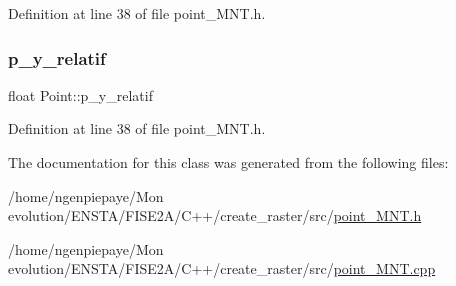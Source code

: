 Definition at line 38 of file point\+\_\+\+M\+N\+T.\+h.

\mbox{\label{class_point_af5a6763229a95cb09ef94d605fe3307a}} 
\subsubsection{\texorpdfstring{p\+\_\+y\+\_\+relatif}{p\_y\_relatif}}
{\footnotesize\ttfamily float Point\+::p\+\_\+y\+\_\+relatif}



Definition at line 38 of file point\+\_\+\+M\+N\+T.\+h.



The documentation for this class was generated from the following files\+:\begin{DoxyCompactItemize}
\item 
/home/ngenpiepaye/\+Mon evolution/\+E\+N\+S\+T\+A/\+F\+I\+S\+E2\+A/\+C++/create\+\_\+raster/src/\hyperlink{point___m_n_t_8h}{point\+\_\+\+M\+N\+T.\+h}\item 
/home/ngenpiepaye/\+Mon evolution/\+E\+N\+S\+T\+A/\+F\+I\+S\+E2\+A/\+C++/create\+\_\+raster/src/\hyperlink{point___m_n_t_8cpp}{point\+\_\+\+M\+N\+T.\+cpp}\end{DoxyCompactItemize}
